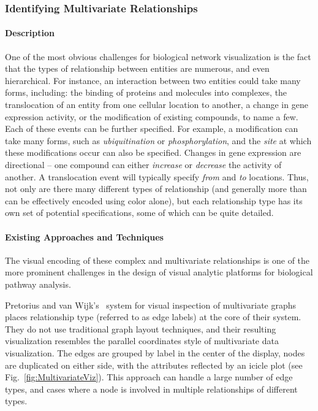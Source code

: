 \documentclass[twocolumn]{bmcart}%
\begin{document}
\subsubsection*{Identifying Multivariate Relationships}

\paragraph*{Description}

One of the most obvious challenges for biological network visualization is the fact that the types of relationship between entities are numerous, and even hierarchical.
For instance, an interaction between two entities could take many forms, including: the binding of proteins and molecules into complexes, the translocation of an entity from one cellular location to another, a change in gene expression activity, or the modification of existing compounds, to name a few.
Each of these events can be further specified.
For example, a modification can take many forms, such as \textit{ubiquitination} or \textit{phosphorylation}, and the \textit{site} at which these modifications occur can also be specified.
Changes in gene expression are directional -- one compound can either \textit{increase} or \textit{decrease} the activity of another.
A translocation event will typically specify \textit{from} and \textit{to} locations.
Thus, not only are there many different types of relationship (and generally more than can be effectively encoded using color alone), but each relationship type has its own set of potential specifications, some of which can be quite detailed.


\paragraph*{Existing Approaches and Techniques}

The visual encoding of these complex and multivariate relationships is one of the more prominent challenges in the design of visual analytic platforms for biological pathway analysis.

Pretorius and van Wijk's~\cite{pretorius2008} system for visual inspection of multivariate graphs places relationship type (referred to as edge labels) at the core of their system.
They do not use traditional graph layout techniques, and their resulting visualization resembles the parallel coordinates style of multivariate data visualization.
The edges are grouped by label in the center of the display, nodes are duplicated on either side, with the attributes reflected by an icicle plot (see Fig.~\ref{fig:MultivariateViz}).
This approach can handle a large number of edge types, and cases where a node is involved in multiple relationships of different types.
\end{document}
